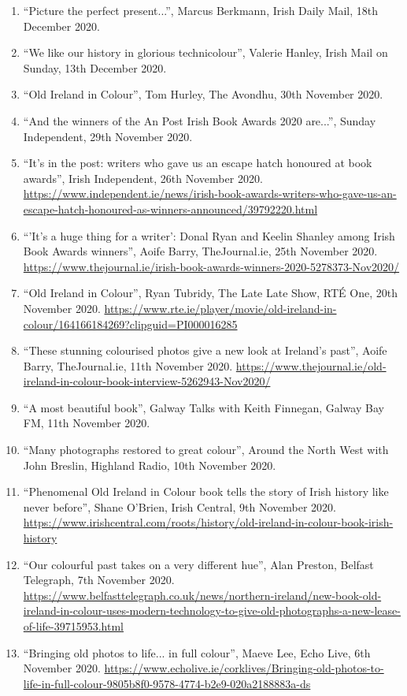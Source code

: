 \documentclass[10pt,a4paper]{res} %
\begin{document}
\begin{resume}
{\begin{enumerate}
\item ``Picture the perfect present...'', Marcus Berkmann, Irish Daily Mail, 18th December 2020.
\item ``We like our history in glorious technicolour'', Valerie Hanley, Irish Mail on Sunday, 13th December 2020.
\item ``Old Ireland in Colour'', Tom Hurley, The Avondhu, 30th November 2020.
\item ``And the winners of the An Post Irish Book Awards 2020 are...'', Sunday Independent, 29th November 2020.
\item ``It's in the post: writers who gave us an escape hatch honoured at book awards'', Irish Independent, 26th November 2020. \url{https://www.independent.ie/news/irish-book-awards-writers-who-gave-us-an-escape-hatch-honoured-as-winners-announced/39792220.html}
\item ``'It's a huge thing for a writer': Donal Ryan and Keelin Shanley among Irish Book Awards winners'', Aoife Barry, TheJournal.ie, 25th November 2020. \url{https://www.thejournal.ie/irish-book-awards-winners-2020-5278373-Nov2020/}
\item ``Old Ireland in Colour'', Ryan Tubridy, The Late Late Show, RT\'{E} One, 20th November 2020. \url{https://www.rte.ie/player/movie/old-ireland-in-colour/164166184269?clipguid=PI000016285}
\item ``These stunning colourised photos give a new look at Ireland's past'', Aoife Barry, TheJournal.ie, 11th November 2020. \url{https://www.thejournal.ie/old-ireland-in-colour-book-interview-5262943-Nov2020/}
\item ``A most beautiful book'', Galway Talks with Keith Finnegan, Galway Bay FM, 11th November 2020.
\item ``Many photographs restored to great colour'', Around the North West with John Breslin, Highland Radio, 10th November 2020.
\item ``Phenomenal Old Ireland in Colour book tells the story of Irish history like never before'', Shane O'Brien, Irish Central, 9th November 2020. \url{https://www.irishcentral.com/roots/history/old-ireland-in-colour-book-irish-history}
\item ``Our colourful past takes on a very different hue'', Alan Preston, Belfast Telegraph, 7th November 2020. \url{https://www.belfasttelegraph.co.uk/news/northern-ireland/new-book-old-ireland-in-colour-uses-modern-technology-to-give-old-photographs-a-new-lease-of-life-39715953.html}
\item ``Bringing old photos to life... in full colour'', Maeve Lee, Echo Live, 6th November 2020. \url{https://www.echolive.ie/corklives/Bringing-old-photos-to-life-in-full-colour-9805b8f0-9578-4774-b2e9-020a2188883a-ds}

\end{enumerate}}
\end{resume}
\end{document}
